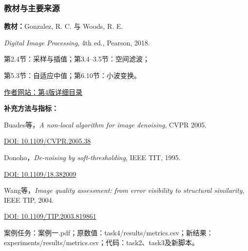 \documentclass[11pt,aspectratio=169]{beamer}
\newcommand{\source}[1]{\vfill{\fontsize{7.5}{9}\selectfont\color{Muted}#1\par}}
\begin{document}
\begin{frame}
\frametitle{教材与主要来源}
{\small
\textbf{教材：}Gonzalez, R. C. 与 Woods, R. E.\par
\textit{Digital Image Processing}, 4th ed., Pearson, 2018.\par
\vspace{2mm}
第2.4节：采样与插值；第3.4--3.5节：空间滤波；\par
第5.3节：自适应中值；第6.10节：小波变换。\par
\href{https://www.imageprocessingplace.com/downloads_V3/dip4e_downloads/dip4e_sample_book_material/dip4e_detailed_TOC.pdf}{作者网站：第4版详细目录}\par
\vspace{3mm}
\textbf{补充方法与指标：}\par
Buades等，\textit{A non-local algorithm for image denoising}, CVPR 2005.\par
\href{https://doi.org/10.1109/CVPR.2005.38}{DOI: 10.1109/CVPR.2005.38}\par
Donoho，\textit{De-noising by soft-thresholding}, IEEE TIT, 1995.\par
\href{https://doi.org/10.1109/18.382009}{DOI: 10.1109/18.382009}\par
Wang等，\textit{Image quality assessment: from error visibility to structural similarity}, IEEE TIP, 2004.\par
\href{https://doi.org/10.1109/TIP.2003.819861}{DOI: 10.1109/TIP.2003.819861}\par
}
\source{案例任务：案例一.pdf；原数值：task4/results/metrics.csv；新结果：experiments/results/metrics.csv；代码：task2、task3及新脚本。}
\end{frame}
\end{document}
